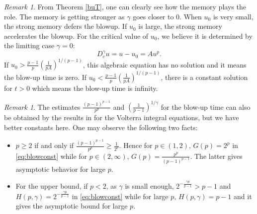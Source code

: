 \documentclass[12pt]{amsart}%
\theoremstyle{definition}
\theoremstyle{remark}
\newtheorem{rmk}[thm]{Remark}
\renewcommand{\geq}{\geqslant}
\begin{document}
\begin{rmk}
From Theorem \ref{buT}, one can clearly see how the memory plays the role. The memory is getting stronger as $\gamma$ goes closer to $0$. When $u_0$ is very small, the strong memory defers the blowup. If $u_0$ is large, the strong memory accelerates the blowup. For the critical value of $u_0$, we believe it is determined by the limiting case $\gamma=0$:
\[
D_c^{\gamma}u=u-u_0=Au^p.
\]
If $u_0>\frac{p-1}{p}\left(\frac{1}{pA}\right)^{1/(p-1)}$, this algebraic equation has no solution and it means the blow-up time is zero.
If $u_0<\frac{p-1}{p}\left(\frac{1}{pA}\right)^{1/(p-1)}$, there is a constant solution for $t>0$ which means the blow-up time is infinity.
\end{rmk}
\begin{rmk}
The estimates $\frac{(p-1)^{p-1}}{p^p}$ and $(\frac{1}{p-1})^{1/\gamma}$ for the blow-up time can also be obtained by the results in \cite{roberts1996growth} for the Volterra integral equations, but we have better constants here. One may observe the following two facts:
\begin{itemize}
\item $p\geq 2$ if and only if $\frac{(p-1)^{p-1}}{p^p}\geq \frac{1}{2^p}$. Hence for $p\in (1,2)$, $G(p)=2^p$ in \eqref{eq:blowconst} while for $p\in (2,\infty)$, $G(p)=\frac{p^p}{(p-1)^{p-1}}$. The latter gives asymptotic behavior for large $p$. 
\item For the upper bound, if $p<2$, as $\gamma$ is small enough,  $2^{-\frac{\gamma p}{p-1}}>p-1$ and $H(p, \gamma)=2^{-\frac{\gamma p}{p-1}}$  in \eqref{eq:blowconst} while for large $p$, $H(p,\gamma)=p-1$ and it gives the asymptotic bound for large $p$.
\end{itemize}
\end{rmk}

\end{document}
